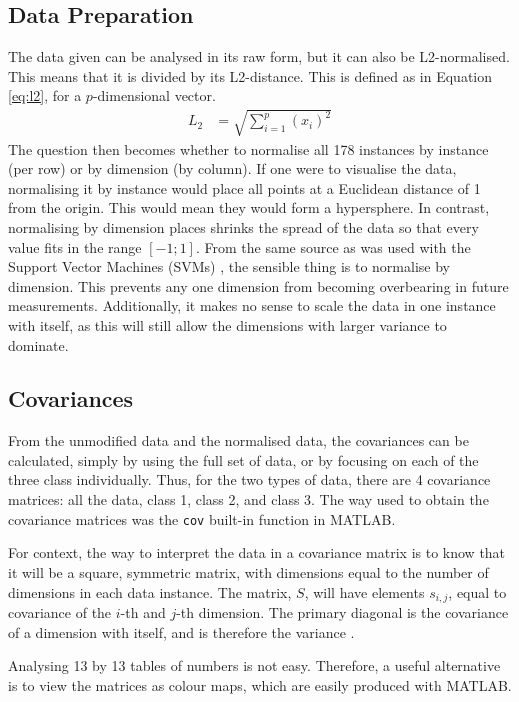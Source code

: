 \documentclass[a4paper, 10pt, conference]{ieeeconf}
\begin{document}
\subsection{Data Preparation}
The data given can be analysed in its raw form, but it can also be L2-normalised. This means that it is divided by its L2-distance. This is defined as in Equation \ref{eq:l2}, for a $p$-dimensional vector.
\begin{align}
  L_2 &= \sqrt{\sum_{i = 1}^{p} \left( x_i \right) ^2 }\label{eq:l2}
\end{align}
The question then becomes whether to normalise all 178 instances by instance (per row) or by dimension (by column). If one were to visualise the data, normalising it by instance would place all points at a Euclidean distance of 1 from the origin. This would mean they would form a hypersphere. In contrast, normalising by dimension places shrinks the spread of the data so that every value fits in the range $[-1; 1]$. From the same source as was used with the Support Vector Machines (SVMs) \cite{scale}, the sensible thing is to normalise by dimension. This prevents any one dimension from becoming overbearing in future measurements. Additionally, it makes no sense to scale the data in one instance with itself, as this will still allow the dimensions with larger variance to dominate.

\subsection{Covariances}
From the unmodified data and the normalised data, the covariances can be calculated, simply by using the full set of data, or by focusing on each of the three class individually. Thus, for the two types of data, there are 4 covariance matrices: all the data, class 1, class 2, and class 3. The way used to obtain the covariance matrices was the \texttt{cov} built-in function in MATLAB.

For context, the way to interpret the data in a covariance matrix is to know that it will be a square, symmetric matrix, with dimensions equal to the number of dimensions in each data instance. The matrix, $S$, will have elements $s_{i, j}$, equal to covariance of the $i$-th and $j$-th dimension. The primary diagonal is the covariance of a dimension with itself, and is therefore the variance \cite{cov}.

Analysing 13 by 13 tables of numbers is not easy. Therefore, a useful alternative is to view the matrices as colour maps, which are easily produced with MATLAB. 
\end{document}
